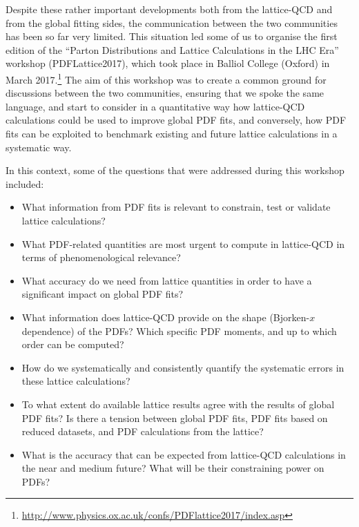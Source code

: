 Despite these rather important developments both from the lattice-QCD
and from the global fitting sides, the communication between the
two communities has been so far very limited.
%
This situation led some of us
to organise the first edition of the
``Parton Distributions and Lattice Calculations in the LHC Era''
workshop (PDFLattice2017), which took
place in Balliol College (Oxford) in March
2017.\footnote{\url{http://www.physics.ox.ac.uk/confs/PDFlattice2017/index.asp}}
%
The aim of this workshop was to create a common ground for discussions
between the two communities, ensuring that we spoke the same language,
and start to consider in a quantitative way how lattice-QCD calculations 
could be used to improve global PDF fits, and conversely, how PDF fits 
can be exploited to benchmark existing and future lattice calculations 
in a systematic way.

In this context, some of the questions that were addressed during this workshop
included:
\begin{itemize}
\item What information from PDF fits is relevant to constrain, 
  test or validate lattice calculations?

\item What PDF-related quantities are most urgent
  to compute in lattice-QCD in terms of phenomenological relevance?

\item What accuracy do we need from lattice quantities 
  in order to have a significant impact on global PDF fits?

\item What information does lattice-QCD provide on the
  shape (Bjorken-$x$ dependence) of the PDFs? Which specific
  PDF moments, and up to which order can be computed?
  
\item How do we systematically and consistently quantify the systematic errors 
in these lattice calculations?

\item To what extent do available lattice results agree with the results of
  global PDF fits? Is there a tension between global PDF fits, PDF
  fits based on reduced datasets, and PDF calculations from the lattice?

\item What is the accuracy that can be expected from lattice-QCD
  calculations in the near and medium future? What will be their
  constraining power on PDFs?

\end{itemize}

